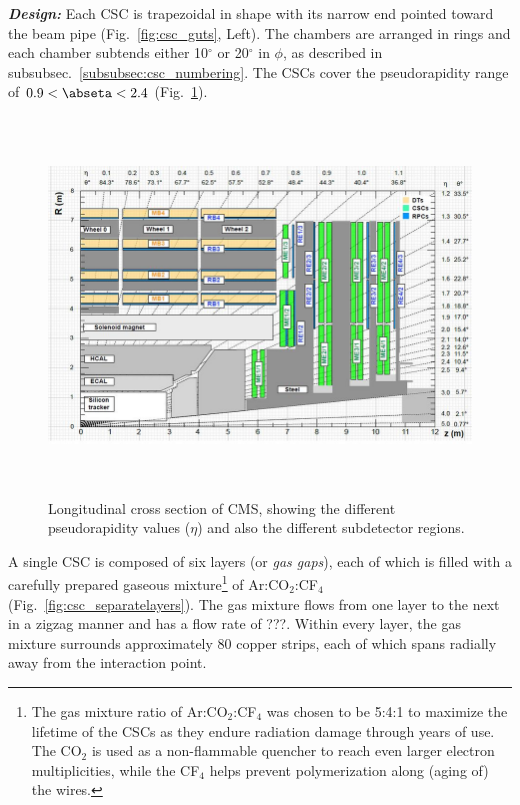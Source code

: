 \textit{\textbf{Design:}}
Each CSC is trapezoidal in shape with its narrow end pointed toward the beam pipe (Fig.~\ref{fig:csc_guts}, Left).
The chambers are arranged in rings and each chamber subtends either 10$^\circ$ or 20$^\circ$ in $\phi$, as described in subsubsec.~\ref{subsubsec:csc_numbering}.
The CSCs cover the pseudorapidity range of $0.9 < \abseta < 2.4$ (Fig.~\ref{fig:cms_long_view_subdetectors}).
\begin{figure}[pbth]
    \centering
    \includegraphics[width=15cm,height=10cm,keepaspectratio]{figures/cms/cms_longitudinal_view.png}
        \caption{
        Longitudinal cross section of CMS, showing the different pseudorapidity values ($\eta$) and also the different subdetector regions.
        }
        \label{fig:cms_long_view_subdetectors}
\end{figure}
A single CSC is composed of six layers (or \emph{gas gaps}), each of which is filled with a carefully prepared gaseous mixture\footnote{
    The gas mixture ratio of Ar:CO$_{2}$:CF$_{4}$ was chosen to be 5:4:1 to maximize the lifetime of the CSCs as they endure radiation damage through years of use.
    The CO$_{2}$ is used as a non-flammable quencher to reach even larger electron multiplicities, while the CF$_{4}$ helps prevent polymerization along (aging of) the wires.
    }
of Ar:CO$_{2}$:CF$_{4}$ (Fig.~\ref{fig:csc_separatelayers}).
The gas mixture flows from one layer to the next in a zigzag manner and has a flow rate of ???.
Within every layer, the gas mixture surrounds approximately 80 copper strips, each of which spans radially away from the interaction point.
